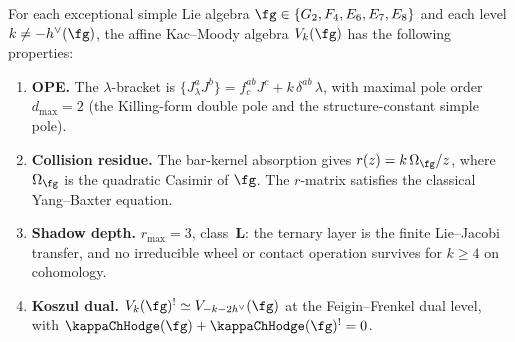 \begin{proposition}
\label{prop:exceptional-class-L}
For each exceptional simple Lie algebra
$\fg \in \{G_2, F_4, E_6, E_7, E_8\}$ and each level
$k \ne -h^\vee(\fg)$, the affine Kac--Moody algebra $V_k(\fg)$
has the following properties:
\begin{enumerate}[label=\textup{(\roman*)},nosep]
\item \textbf{OPE.}
 The $\lambda$-bracket is
 $\{J^a_\lambda J^b\} = f^{ab}_c J^c + k\,\delta^{ab}\,\lambda$,
 with maximal pole order $d_{\max} = 2$
 \textup{(}the Killing-form double pole and the
 structure-constant simple pole\textup{)}.

\item \textbf{Collision residue.}
 The bar-kernel absorption gives
 $r(z) = k\,\Omega_\fg/z$, where $\Omega_\fg$ is the quadratic
 Casimir of $\fg$. The $r$-matrix satisfies the classical
 Yang--Baxter equation.

\item \textbf{Shadow depth.}
$r_{\max} = 3$, class~$\mathbf{L}$: the ternary layer is the
finite Lie--Jacobi transfer, and no irreducible wheel or contact
operation survives for $k \ge 4$ on cohomology.

\item \textbf{Koszul dual.}
 $V_k(\fg)^! \simeq V_{-k-2h^\vee}(\fg)$ at the Feigin--Frenkel
 dual level, with
 $\kappaChHodge(\fg) + \kappaChHodge(\fg)^! = 0$.


\end{enumerate}
\end{proposition}
